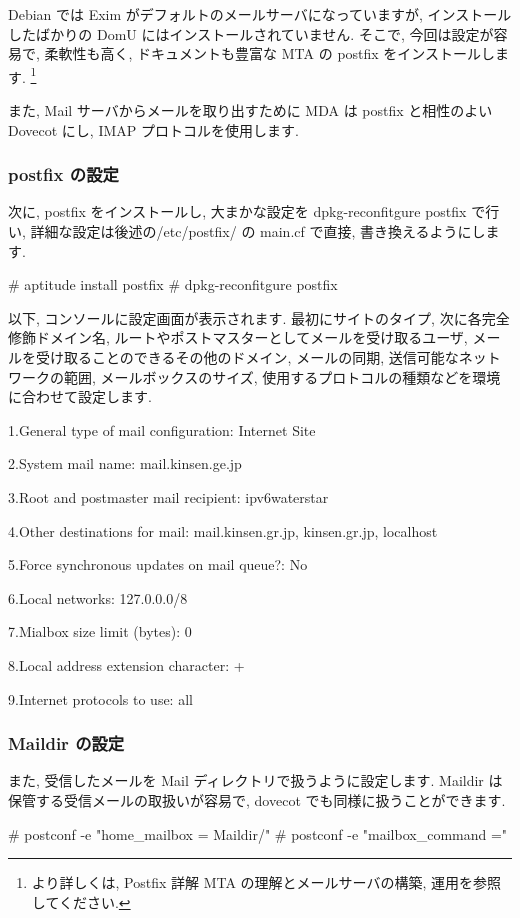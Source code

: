 \documentclass[mingoth,a4paper]{jsarticle}
\begin{document}
Debian では Exim がデフォルトのメールサーバになっていますが, インストールしたばかりの DomU にはインストールされていません. そこで, 今回は設定が容易で, 柔軟性も高く, ドキュメントも豊富な MTA の postfix をインストールします. \footnote{より詳しくは, Postfix 詳解  MTA の理解とメールサーバの構築, 運用を参照してください. }

また, Mail サーバからメールを取り出すために MDA は postfix と相性のよい Dovecot にし, IMAP プロトコルを使用します.

\subsubsection{postfix の設定}
次に, postfix をインストールし, 大まかな設定を dpkg-reconfitgure postfix で行い, 詳細な設定は後述の/etc/postfix/ の main.cf で直接, 書き換えるようにします.

\begin{commandline}
# aptitude install postfix
# dpkg-reconfitgure postfix 
\end{commandline}

以下, コンソールに設定画面が表示されます. 最初にサイトのタイプ, 次に各完全修飾ドメイン名, ルートやポストマスターとしてメールを受け取るユーザ, メールを受け取ることのできるその他のドメイン, メールの同期, 送信可能なネットワークの範囲, メールボックスのサイズ, 使用するプロトコルの種類などを環境に合わせて設定します.
\begin{commandline}
1.General type of mail configuration: Internet Site

2.System mail name: mail.kinsen.ge.jp

3.Root and postmaster mail recipient: ipv6waterstar

4.Other destinations for mail: mail.kinsen.gr.jp, kinsen.gr.jp, localhost

5.Force synchronous updates on mail queue?: No

6.Local networks: 127.0.0.0/8

7.Mialbox size limit (bytes): 0

8.Local address extension character: +

9.Internet protocols to use: all
\end{commandline}

\subsubsection{Maildir の設定}
また, 受信したメールを Mail ディレクトリで扱うように設定します. Maildir は保管する受信メールの取扱いが容易で, dovecot でも同様に扱うことができます.
\begin{commandline}
# postconf -e "home_mailbox = Maildir/"
# postconf -e "mailbox_command ="
\end{commandline}
\end{document}
